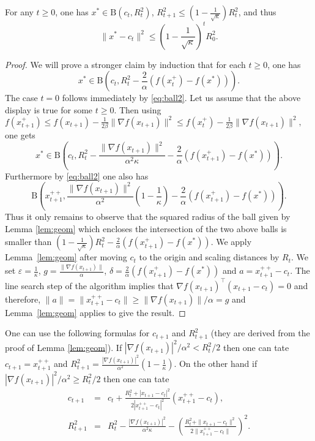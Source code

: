 \documentclass[openany]{now}
\newcommand{\mB}{\mathrm{B}}
\renewcommand{\epsilon}{\varepsilon}
\begin{document}
\begin{theorem}\label{thm:main}
For any $t \geq 0$, one has $x^* \in \mB(c_t, R_t^2)$, $R_{t+1}^2 \leq \left(1 - \frac{1}{\sqrt{\kappa}}\right) R_t^2$, and thus
$$\|x^* - c_t\|^2 \leq \left(1 - \frac{1}{\sqrt{\kappa}}\right)^t R_0^2 .$$
\end{theorem}

\begin{proof} 
We will prove a stronger claim by induction that for each $t\geq 0$, one has
$$x^* \in \mB\left(c_t, R_t^2 - \frac{2}{\alpha} \left(f(x_t^+) - f(x^*)\right)\right) .$$
The case $t=0$ follows immediately by \eqref{eq:ball2}. Let us assume that the above display is true for some $t \geq 0$. Then using $f(x_{t+1}^+) \leq f(x_{t+1}) - \frac{1}{2\beta} \|\nabla f(x_{t+1})\|^2 \leq f(x_t^+) - \frac{1}{2\beta} \|\nabla f(x_{t+1})\|^2 ,$
one gets
$$x^* \in \mB\left(c_t, R_t^2 - \frac{\|\nabla f(x_{t+1})\|^2}{\alpha^2 \kappa} - \frac{2}{\alpha} \left(f(x_{t+1}^+) - f(x^*)\right) \right) .$$
Furthermore by \eqref{eq:ball2} one also has
$$\mB\left(x_{t+1}^{++}, \frac{\|\nabla f(x_{t+1})\|^2}{\alpha^2} \left(1 - \frac{1}{\kappa}\right) - \frac{2}{\alpha} \left(f(x_{t+1}^+) - f(x^*)\right) \right).$$
Thus it only remains to observe that the squared radius of the ball given by Lemma \ref{lem:geom} which encloses the intersection of the two above balls is smaller than $\left(1 - \frac{1}{\sqrt{\kappa}}\right) R_t^2 - \frac{2}{\alpha} (f(x_{t+1}^+) - f(x^*))$.
We apply Lemma~\ref{lem:geom} after moving $c_t$ to the origin and scaling distances by $R_t$. We set $\epsilon =\frac{1}{\kappa}$, $g=\frac{\|\nabla f(x_{t+1})\|}{\alpha}$, $\delta=\frac{2}{\alpha}\left(f(x_{t+1}^+)-f(x^*)\right)$ and $a={x_{t+1}^{++}-c_t}$.  The line search step of the algorithm implies that $\nabla f(x_{t+1})^{\top} (x_{t+1} - c_t) = 0$ and therefore, $\|a\|=\|x_{t+1}^{++} - c_t\| \geq \|\nabla f(x_{t+1})\|/\alpha=g$ and Lemma~\ref{lem:geom} applies to give the result.
\end{proof}

One can use the following formulas for $c_{t+1}$ and $R^2_{t+1}$ (they are derived from the proof of Lemma \ref{lem:geom}). If $|\nabla f(x_{t+1})|^2 / \alpha^2 < R_t^2 / 2$ then one can tate $c_{t+1} = x_{t+1}^{++}$ and $R_{t+1}^2 = \frac{|\nabla f(x_{t+1})|^2}{\alpha^2} \left(1 - \frac{1}{\kappa}\right)$. On the other hand if $|\nabla f(x_{t+1})|^2 / \alpha^2 \geq R_t^2 / 2$ then one can tate
\begin{eqnarray*}
c_{t+1} & = & c_t + \frac{R_t^2 + |x_{t+1} - c_t|^2}{2 |x_{t+1}^{++} - c_t|^2} (x_{t+1}^{++} - c_t) , \\
R_{t+1}^2 & = & R_t^2 - \frac{|\nabla f(x_{t+1})|^2}{\alpha^2 \kappa} - \left( \frac{R_t^2 + \|x_{t+1} - c_t\|^2}{2 \|x_{t+1}^{++} - c_t\|}  \right)^2.
\end{eqnarray*}
\end{document}
